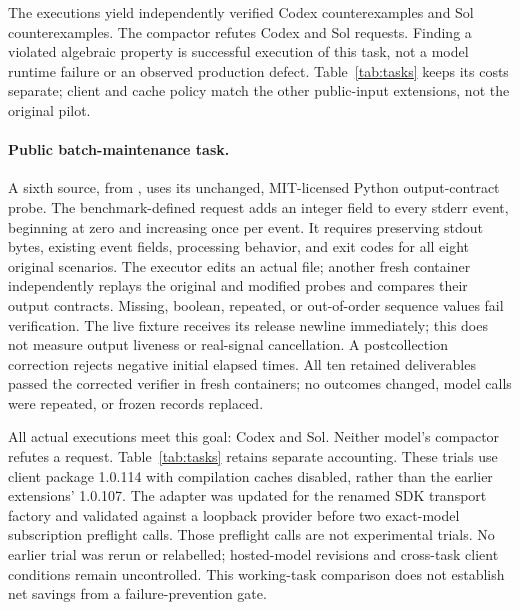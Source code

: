 The \PropertyExecutions{} executions yield \PropertyCodexAchieved{}
independently verified Codex counterexamples and \PropertySolAchieved{}
Sol counterexamples. The compactor refutes \PropertyCodexRefuted{}
Codex and \PropertySolRefuted{} Sol requests. Finding a violated algebraic
property is successful execution of this task, not a model runtime failure
or an observed production defect. Table~\ref{tab:tasks} keeps its
costs separate; client and cache policy match the other public-input
extensions, not the original pilot.

\paragraph{Public batch-maintenance task.}
A sixth source,  from ,
uses its unchanged, MIT-licensed Python output-contract probe. The
benchmark-defined request adds an integer  field to every
stderr event, beginning at zero and increasing once per event. It requires
preserving stdout bytes, existing event fields, processing behavior, and
exit codes for all eight original scenarios. The executor edits an actual
file; another fresh container independently replays the original and modified
probes and compares their output contracts. Missing, boolean, repeated, or
out-of-order sequence values fail verification. The live fixture receives
its release newline immediately; this does not measure output liveness or
real-signal cancellation.
A postcollection correction rejects negative initial elapsed times. All ten
retained deliverables passed the corrected verifier in fresh containers;
no outcomes changed, model calls were repeated, or frozen records replaced.

All \BatchExecutions{} actual executions meet this goal:
\BatchCodexAchieved{} Codex and \BatchSolAchieved{} Sol. Neither model's
compactor refutes a request. Table~\ref{tab:tasks} retains separate
accounting. These trials use client package 1.0.114 with compilation caches
disabled, rather than the earlier extensions' 1.0.107. The adapter was
updated for the renamed SDK transport factory and validated against a
loopback provider before two exact-model subscription preflight calls.
Those preflight calls are not experimental trials. No earlier trial was
rerun or relabelled; hosted-model revisions and cross-task client conditions
remain uncontrolled. This working-task comparison does not establish net
savings from a failure-prevention gate.

